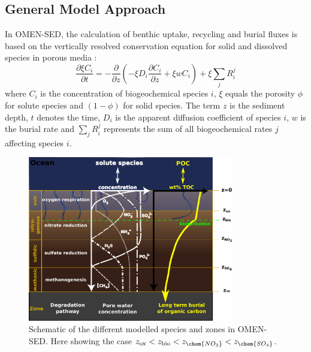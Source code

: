 \documentclass[gmd, manuscript]{copernicus}
\begin{document}
\subsection {General Model Approach} \label{subsec:GeneralModelApproach}
In OMEN-SED, the calculation of benthic uptake, recycling and burial fluxes is based on the vertically resolved conservation equation for solid and dissolved species in porous media 
\citep[e.g.][]{berner_early_1980, boudreau1997diagenetic}:
\begin{equation} 
\frac{\partial \xi C_i}{\partial t}=-\frac{\partial}{\partial z}\left( -\xi D_i \frac{\partial C_i}{\partial z} +\xi w C_i\right)    +\xi \sum_j R_i^j \label{eq:Eq_generaldiagenetic}
\end{equation}
where $C_i$ is the concentration of biogeochemical species $i$, $\xi$ equals the porosity $\phi$ for solute species and $(1-\phi)$ for solid species. The term $z$ is the sediment depth, $t$ denotes the time, 
$D_i$ is the apparent diffusion coefficient of species $i$, $w$ is the burial rate  and $\sum_j R_i^j$ represents the sum of all biogeochemical rates $j$ affecting species $i$. 

\begin{figure}[htbp]
\begin{center}
	\includegraphics[width=0.8\textwidth]{figures/Sediment-model-with-profiles.pdf}
	\caption{Schematic of the different modelled species and zones in OMEN-SED. Here showing the case $z_{\mathrm{ox}} < z_{\mathrm{bio}} < z_{\chem{NO_3}} < z_{\chem{SO_4}}$.}
	\label{fig:Sediment_layers}
	\end{center}
\end{figure}
\end{document}
